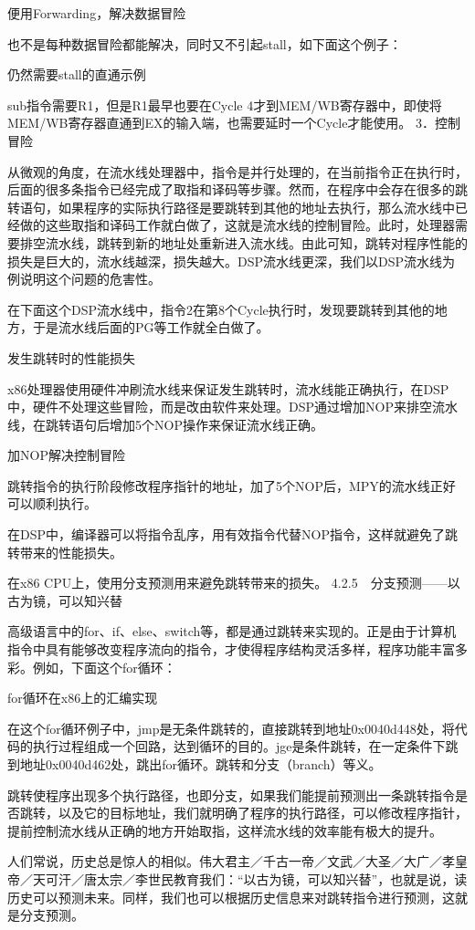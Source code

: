 \documentclass[12pt,UTF8]{ctexbook}
\begin{document}
便用Forwarding，解决数据冒险

也不是每种数据冒险都能解决，同时又不引起stall，如下面这个例子：

仍然需要stall的直通示例

sub指令需要R1，但是R1最早也要在Cycle 4才到MEM/WB寄存器中，即使将MEM/WB寄存器直通到EX的输入端，也需要延时一个Cycle才能使用。
3．控制冒险

从微观的角度，在流水线处理器中，指令是并行处理的，在当前指令正在执行时，后面的很多条指令已经完成了取指和译码等步骤。然而，在程序中会存在很多的跳转语句，如果程序的实际执行路径是要跳转到其他的地址去执行，那么流水线中已经做的这些取指和译码工作就白做了，这就是流水线的控制冒险。此时，处理器需要排空流水线，跳转到新的地址处重新进入流水线。由此可知，跳转对程序性能的损失是巨大的，流水线越深，损失越大。DSP流水线更深，我们以DSP流水线为例说明这个问题的危害性。

在下面这个DSP流水线中，指令2在第8个Cycle执行时，发现要跳转到其他的地方，于是流水线后面的PG等工作就全白做了。

发生跳转时的性能损失

x86处理器使用硬件冲刷流水线来保证发生跳转时，流水线能正确执行，在DSP中，硬件不处理这些冒险，而是改由软件来处理。DSP通过增加NOP来排空流水线，在跳转语句后增加5个NOP操作来保证流水线正确。

加NOP解决控制冒险

跳转指令的执行阶段修改程序指针的地址，加了5个NOP后，MPY的流水线正好可以顺利执行。

在DSP中，编译器可以将指令乱序，用有效指令代替NOP指令，这样就避免了跳转带来的性能损失。

在x86 CPU上，使用分支预测用来避免跳转带来的损失。
4.2.5　分支预测——以古为镜，可以知兴替

高级语言中的for、if、else、switch等，都是通过跳转来实现的。正是由于计算机指令中具有能够改变程序流向的指令，才使得程序结构灵活多样，程序功能丰富多彩。例如，下面这个for循环：

for循环在x86上的汇编实现

在这个for循环例子中，jmp是无条件跳转的，直接跳转到地址0x0040d448处，将代码的执行过程组成一个回路，达到循环的目的。jge是条件跳转，在一定条件下跳到地址0x0040d462处，跳出for循环。跳转和分支（branch）等义。

跳转使程序出现多个执行路径，也即分支，如果我们能提前预测出一条跳转指令是否跳转，以及它的目标地址，我们就明确了程序的执行路径，可以修改程序指针，提前控制流水线从正确的地方开始取指，这样流水线的效率能有极大的提升。

人们常说，历史总是惊人的相似。伟大君主／千古一帝／文武／大圣／大广／孝皇帝／天可汗／唐太宗／李世民教育我们：“以古为镜，可以知兴替”，也就是说，读历史可以预测未来。同样，我们也可以根据历史信息来对跳转指令进行预测，这就是分支预测。
\end{document}
